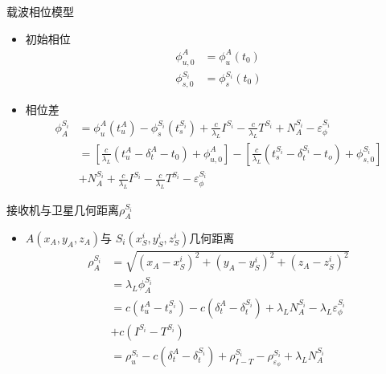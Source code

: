 \begin{frame}{载波相位模型}
    \begin{itemize}
        \item 初始相位
        \begin{align*}
            \phi _ { u, 0 } ^ A &= \phi _ u ^ A \left( t _ 0 \right) \\
            \phi _ { s, 0 } ^ { S _ i } &= \phi _ s ^ { S _ i } \left( t _ 0 \right)
        \end{align*}
        \item 相位差
        \begin{align*}
            \phi _ A ^ { S _ i } &= \phi _ u ^ A \left( t _ u ^ A \right)
            - \phi _ s ^ { S _ i } \left( t _ s ^ { S _ i } \right) 
            + \frac{ c }{ \lambda _ L } I ^ { S _ i } - \frac{ c }{ \lambda _ L } T ^ { S _ i }
            + N _ A ^ { S _ i }
            - \varepsilon _ \phi ^ { S _ i } \\
            &= \left[ \frac{ c }{ \lambda _ L } \left( t _ u ^ A 
            - \delta _ t ^ A - t _ 0 \right)  + \phi _ { u, 0 } ^ A \right] 
            - \left[ \frac{ c }{ \lambda _ L } \left( t _ s ^ { S _ i } 
            - \delta _ t ^ { S _ i } - t _ o \right) + \phi _ { s, 0 } ^ { S _ i } \right] \\
            &+ N _ A ^ { S _ i } + \frac{ c }{ \lambda _ L } I ^ { S _ i } 
            - \frac{ c }{ \lambda _ L } T ^ { S _ i }
            - \varepsilon _ \phi ^ { S _ i }
        \end{align*}
    \end{itemize}
\end{frame}

\begin{frame}{接收机与卫星几何距离$\rho _ A ^ { S _ i }$}
    \begin{itemize}
        \item $A \left( x _ A, y _ A, z _ A \right)$与
        $S _ i \left( x _ S ^ i, y _ S ^ i, z _ S ^ i \right)$几何距离
        \begin{align*}
            \rho _ A ^ { S _ i } &= \sqrt{ \left( x _ A - x _ S ^ i \right) ^ 2 
            + \left( y _ A - y _ S ^ i \right) ^ 2 
            + \left( z _ A - z _ S ^ i \right) ^ 2 } \\
            &= \lambda _ L \phi _ A ^ { S _ i } \\
            &= c \left( t _ u ^ A - t _ s ^ { S _ i } \right) 
            - c \left( \delta _ t ^ A - \delta _ t ^ { S _ i } \right) 
            + \lambda _ L N _ A ^ { S _ i }
            - \lambda _ L \varepsilon _ \phi ^ { S _ i } \\
            &+ c \left( I ^ { S _ i } - T ^ { S _ i } \right) \\
            &= \rho _ u ^ { S _ i } - c \left( \delta _ t ^ A - \delta _ t ^ { S _ i } \right) 
            + \rho _ { I - T } ^ { S _ i } - \rho _ { \varepsilon _ \phi } ^ { S _ i }
            + \lambda _ L N _ A ^ { S _ i }
        \end{align*}
    \end{itemize}
\end{frame}

